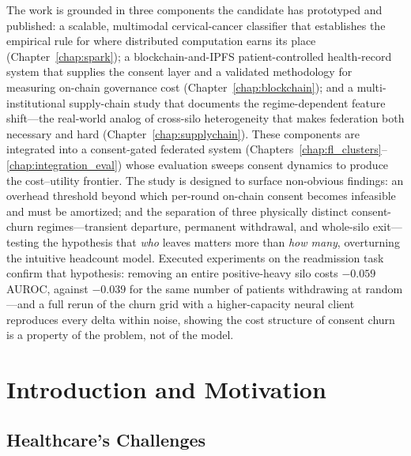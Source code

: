 \documentclass[12pt]{report}
\begin{document}
The work is grounded in three components the candidate has prototyped and
published: a scalable, multimodal cervical-cancer classifier that establishes the
empirical rule for where distributed computation
earns its place (Chapter~\ref{chap:spark}); a blockchain-and-IPFS
patient-controlled health-record system that supplies the consent layer and a
validated methodology for measuring on-chain governance cost
(Chapter~\ref{chap:blockchain}); and a multi-institutional supply-chain study that
documents the regime-dependent feature shift---the real-world analog of
cross-silo heterogeneity that makes federation both necessary and hard
(Chapter~\ref{chap:supplychain}). These components are integrated into a
consent-gated federated system (Chapters~\ref{chap:fl_clusters}--%
\ref{chap:integration_eval}) whose evaluation sweeps consent dynamics to produce
the cost--utility frontier. The study is designed to surface non-obvious findings:
an overhead threshold beyond which per-round on-chain consent becomes infeasible
and must be amortized; and the separation of three physically distinct consent-%
churn regimes---transient departure, permanent withdrawal, and whole-silo
exit---testing the hypothesis that \emph{who} leaves matters more than \emph{how
many}, overturning the intuitive headcount model. Executed experiments on the
readmission task confirm that hypothesis: removing an entire positive-heavy silo
costs $-0.059$ AUROC, against $-0.039$ for the same number of patients
withdrawing at random---and a full rerun of the churn grid with a
higher-capacity neural client reproduces every delta within noise, showing the
cost structure of consent churn is a property of the problem, not of the model.

\clearpage
\tableofcontents
\clearpage


\chapter{Introduction and Motivation}\label{chap:intro}

\section{Healthcare’s Challenges}
\end{document}
